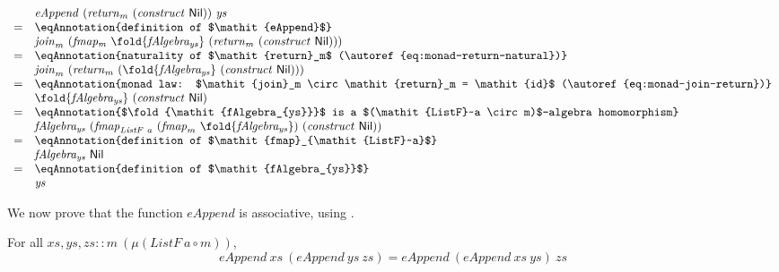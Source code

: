 \begin{displaymath}
  \begin{array}{cl}
    & \mathit{eAppend}~(\mathit{return}_m~(\mathit{construct}~\mathsf{Nil}))~\mathit{ys} \\
    =&\eqAnnotation{definition of $\mathit{eAppend}$} \\
    & \mathit{join}_m~(\mathit{fmap_m}~\fold{\mathit{fAlgebra_{ys}}}~(\mathit{return}_m~(\mathit{construct}~\mathsf{Nil}))) \\
    =&\eqAnnotation{naturality of $\mathit{return}_m$ (\autoref{eq:monad-return-natural})} \\
    & \mathit{join}_m~(\mathit{return}_m~(\fold{\mathit{fAlgebra_{ys}}}~(\mathit{construct}~\mathsf{Nil}))) \\
    =&\eqAnnotation{monad law: $\mathit{join}_m \circ \mathit{return}_m = \mathit{id}$ (\autoref{eq:monad-join-return})} \\
    & \fold{\mathit{fAlgebra_{ys}}}~(\mathit{construct}~\mathsf{Nil}) \\
    =&\eqAnnotation{$\fold{\mathit{fAlgebra_{ys}}}$ is a $(\mathit{ListF}~a \circ m)$-algebra homomorphism} \\
    & \mathit{fAlgebra_{ys}}~(\mathit{fmap}_{\mathit{ListF}~a}~(\mathit{fmap}_m~\fold{\mathit{fAlgebra_{ys}}})~(\mathit{construct}~\mathsf{Nil})) \\
    =&\eqAnnotation{definition of $\mathit{fmap}_{\mathit{ListF}~a}$} \\
    & \mathit{fAlgebra_{ys}}~\mathsf{Nil} \\
    =&\eqAnnotation{definition of $\mathit{fAlgebra_{ys}}$} \\
    & \mathit{ys}
  \end{array}
\end{displaymath}

We now prove that the function $\mathit{eAppend}$ is associative,
using .

\begin{theorem}\label{thm:direct-eappend-assoc}
  For all $\mathit{xs}, \mathit{ys}, \mathit{zs} :: m~(\mu (\mathit{ListF}~a \circ m))$,
  \begin{displaymath}
    \mathit{eAppend}~\mathit{xs}~(\mathit{eAppend}~\mathit{ys}~\mathit{zs}) = \mathit{eAppend}~(\mathit{eAppend}~\mathit{xs}~\mathit{ys})~\mathit{zs}
  \end{displaymath}
\end{theorem}

